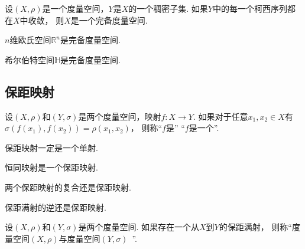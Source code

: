 \begin{corollary}
设\((X,\rho)\)是一个度量空间，\(Y\)是\(X\)的一个稠密子集.
如果\(Y\)中的每一个柯西序列都在\(X\)中收敛，
则\(X\)是一个完备度量空间.
\end{corollary}

\begin{theorem}
\(n\)维欧氏空间\(\mathbb{R}^n\)是完备度量空间.
\end{theorem}

\begin{theorem}
希尔伯特空间\(\mathbb{H}\)是完备度量空间.
\end{theorem}

\subsection{保距映射}
\begin{definition}
设\((X,\rho)\)和\((Y,\sigma)\)是两个度量空间，映射\(f\colon X \to Y\).
如果对于任意\(x_1,x_2 \in X\)有\(\sigma(f(x_1),f(x_2)) = \rho(x_1,x_2)\)，
则称“\(f\)是”
“\(f\)是一个”.
\end{definition}

\begin{proposition}
保距映射一定是一个单射.
\end{proposition}

\begin{proposition}
恒同映射是一个保距映射.
\end{proposition}

\begin{proposition}
两个保距映射的复合还是保距映射.
\end{proposition}

\begin{proposition}
保距满射的逆还是保距映射.
\end{proposition}

\begin{definition}
设\((X,\rho)\)和\((Y,\sigma)\)是两个度量空间.
如果存在一个从\(X\)到\(Y\)的保距满射，
则称“度量空间\((X,\rho)\)与度量空间\((Y,\sigma)\)~”.
\end{definition}


